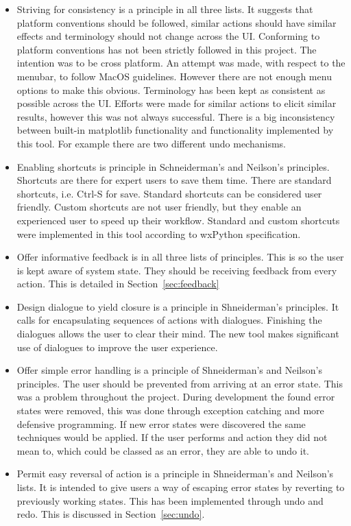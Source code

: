 \begin{itemize}
\item Striving for consistency is a principle in all three lists.  It suggests that platform conventions should be followed, similar actions should have similar effects and terminology should not change across the \ac{UI}.  Conforming to platform conventions has not been strictly followed in this project.  The intention was to be cross platform.  An attempt was made, with respect to the menubar, to follow MacOS guidelines.  However there are not enough menu options to make this obvious.  Terminology has been kept as consistent as possible across the \ac{UI}.  Efforts were made for similar actions to elicit similar results, however this was not always successful.  There is a big inconsistency between built-in matplotlib functionality and functionality implemented by this tool.  For example there are two different undo mechanisms.
\item Enabling shortcuts is principle in Schneiderman's and Neilson's principles.  Shortcuts are there for expert users to save them time.  There are standard shortcuts, i.e. Ctrl-S for save.  Standard shortcuts can be considered user friendly.  Custom shortcuts are not user friendly, but they enable an experienced user to speed up their workflow.  Standard and custom shortcuts were implemented in this tool according to wxPython specification.
\item Offer informative feedback is in all three lists of principles.  This is so the user is kept aware of system state.  They should be receiving feedback from every action.  This is detailed in Section~\ref{sec:feedback}
\item Design dialogue to yield closure is a principle in Shneiderman's principles.  It calls for encapsulating sequences of actions with dialogues.  Finishing the dialogues allows the user to clear their mind.  The new tool makes significant use of dialogues to improve the user experience.
\item Offer simple error handling is a principle of Shneiderman's and Neilson's principles.  The user should be prevented from arriving at an error state.  This was a problem throughout the project.  During development the found error states were removed, this was done through exception catching and more defensive programming.  If new error states were discovered the same techniques would be applied.  If the user performs and action they did not mean to, which could be classed as an error, they are able to undo it.
\item Permit easy reversal of action is a principle in Shneiderman's and Neilson's lists.  It is intended to give users a way of escaping error states by reverting to previously working states.  This has been implemented through undo and redo.  This is discussed in Section~\ref{sec:undo}.

\end{itemize}
